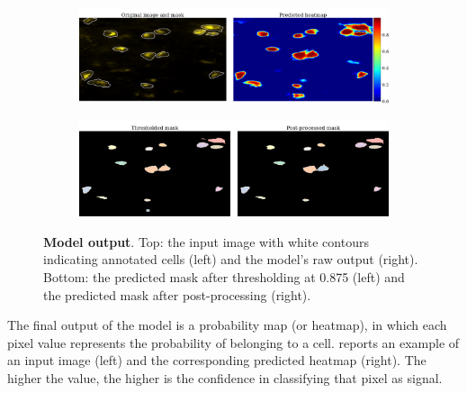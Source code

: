 \begin{figure}
    \begin{subfigure}{\textwidth}
        \centering
        \includegraphics[width=\textwidth]{figures/130_methods/orig+heatmap:278.png}
        \caption{
        }
        \label{fig:raw_output}
        \end{subfigure}
    \begin{subfigure}{\textwidth}
        \centering
        \includegraphics[width=\textwidth]{figures/130_methods/thresh+post_proc:278.png}
        \caption{
        }
        \label{fig:thresh+post_proc}
        \end{subfigure}
    \caption{\textbf{Model output}. 
    Top: the input image with white contours indicating annotated cells  (left) and the model's raw output  (right).
    Bottom: the predicted mask after thresholding at 0.875 (left) and the predicted mask after post-processing (right).}
    \label{fig:model_output}
\end{figure}
The final output of the model is a probability map (or heatmap), in which each pixel value represents the probability of belonging to a cell. 
 reports an example of an input image (left) and the corresponding predicted heatmap (right).
The higher the value, the higher is the confidence in classifying that pixel as signal. 
